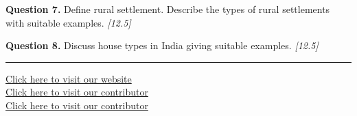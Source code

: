 \documentclass[11pt,a4paper]{article}
\newcommand{\pts}[1]{\hfill   \textit{[#1]}}
\begin{document}
\medskip


\noindent   \textbf{Question 7.} Define rural settlement. Describe the types of rural settlements with suitable examples. \pts{12.5}

\medskip


\noindent   \textbf{Question 8.} Discuss house types in India giving suitable examples. \pts{12.5}

\vfill\rule{\linewidth}{0.4pt}

\begin{center}\small
\href{https://bhu-exam.vercel.app/}{Click here to visit our website}\\[4pt]
\href{https://me-aryan.vercel.app/}{Click here to visit our contributor}\\[4pt]
\href{https://quashan-me.vercel.app/}{Click here to visit our contributor}
\end{center}
\end{document}
